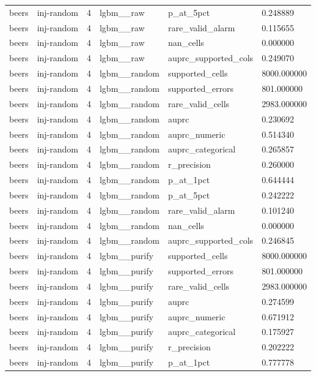 \begin{tabular}{llllll}
beers & inj-random & 4 & lgbm\_\_raw & p\_at\_5pct & 0.248889 \\
beers & inj-random & 4 & lgbm\_\_raw & rare\_valid\_alarm & 0.115655 \\
beers & inj-random & 4 & lgbm\_\_raw & nan\_cells & 0.000000 \\
beers & inj-random & 4 & lgbm\_\_raw & auprc\_supported\_cols & 0.249070 \\
beers & inj-random & 4 & lgbm\_\_random & supported\_cells & 8000.000000 \\
beers & inj-random & 4 & lgbm\_\_random & supported\_errors & 801.000000 \\
beers & inj-random & 4 & lgbm\_\_random & rare\_valid\_cells & 2983.000000 \\
beers & inj-random & 4 & lgbm\_\_random & auprc & 0.230692 \\
beers & inj-random & 4 & lgbm\_\_random & auprc\_numeric & 0.514340 \\
beers & inj-random & 4 & lgbm\_\_random & auprc\_categorical & 0.265857 \\
beers & inj-random & 4 & lgbm\_\_random & r\_precision & 0.260000 \\
beers & inj-random & 4 & lgbm\_\_random & p\_at\_1pct & 0.644444 \\
beers & inj-random & 4 & lgbm\_\_random & p\_at\_5pct & 0.242222 \\
beers & inj-random & 4 & lgbm\_\_random & rare\_valid\_alarm & 0.101240 \\
beers & inj-random & 4 & lgbm\_\_random & nan\_cells & 0.000000 \\
beers & inj-random & 4 & lgbm\_\_random & auprc\_supported\_cols & 0.246845 \\
beers & inj-random & 4 & lgbm\_\_purify & supported\_cells & 8000.000000 \\
beers & inj-random & 4 & lgbm\_\_purify & supported\_errors & 801.000000 \\
beers & inj-random & 4 & lgbm\_\_purify & rare\_valid\_cells & 2983.000000 \\
beers & inj-random & 4 & lgbm\_\_purify & auprc & 0.274599 \\
beers & inj-random & 4 & lgbm\_\_purify & auprc\_numeric & 0.671912 \\
beers & inj-random & 4 & lgbm\_\_purify & auprc\_categorical & 0.175927 \\
beers & inj-random & 4 & lgbm\_\_purify & r\_precision & 0.202222 \\
beers & inj-random & 4 & lgbm\_\_purify & p\_at\_1pct & 0.777778 \\

\end{tabular}

